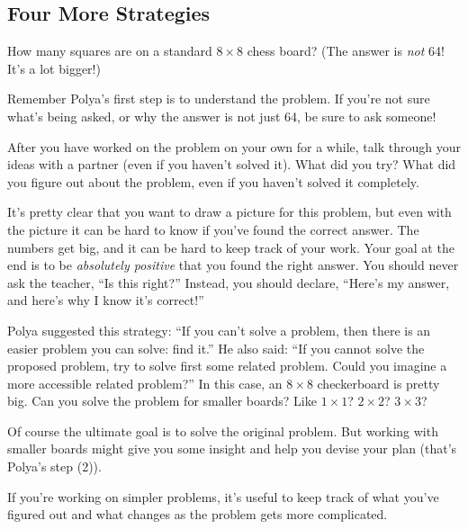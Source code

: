 \subsection{Four More Strategies}
\begin{problem}\label{prob:chessboard}
How many squares are on a standard $8 \times 8$ chess board?  (The answer is \emph{not} 64!  It's a lot bigger!)
\end{problem}

Remember Polya's first step is to understand the problem.  If you're not sure what's being asked, or why the answer is not just 64, be sure to ask someone!


\begin{thinkpair*}
After you have worked on the problem on your own for a while, talk through your ideas with a partner (even if you haven't solved it).  What did you try?   What did you figure out about the problem, even if you haven't solved it completely.
\end{thinkpair*}


It's pretty clear that you want to draw a picture for this problem, but even with the picture it can be hard to know if you've found the correct answer.  The numbers get big, and it can be hard to keep track of your work.  Your goal at the end is to be \emph{absolutely positive} that you found the right answer.  You should never ask the teacher, ``Is this right?''  Instead, you should declare, ``Here's my answer, and here's why I know it's correct!''


\begin{ps}
 Polya suggested this strategy: ``If you can't solve a problem, then there is an easier problem you can solve: find it.''  He also said: ``If you cannot solve the proposed problem, try to solve first some related problem. Could you imagine a more accessible related problem?''  In this case, an $8 \times 8$ checkerboard is pretty big.  Can you solve the problem for smaller boards?  Like $1 \times 1$?  $2 \times 2$?  $3 \times 3$?
\end{ps}

Of course the ultimate goal is to solve the original problem.  But working with smaller boards might give you some insight and help you devise your plan (that's Polya's step (2)).


\begin{ps}
If you're working on simpler problems, it's useful to keep track of what you've figured out and what changes as the problem gets more complicated. 
\end{ps}

